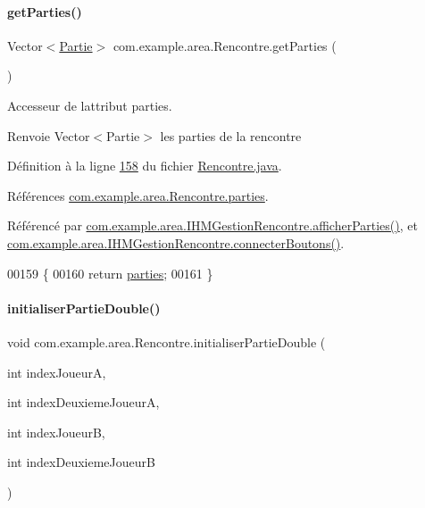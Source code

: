 \paragraph{\texorpdfstring{get\+Parties()}{getParties()}}
{\footnotesize\ttfamily Vector$<$\hyperlink{classcom_1_1example_1_1area_1_1_partie}{Partie}$>$ com.\+example.\+area.\+Rencontre.\+get\+Parties (\begin{DoxyParamCaption}{ }\end{DoxyParamCaption})}



Accesseur de l\textquotesingle{}attribut parties. 

\begin{DoxyReturn}{Renvoie}
Vector$<$\+Partie$>$ les parties de la rencontre 
\end{DoxyReturn}


Définition à la ligne \hyperlink{_rencontre_8java_source_l00158}{158} du fichier \hyperlink{_rencontre_8java_source}{Rencontre.\+java}.



Références \hyperlink{_rencontre_8java_source_l00023}{com.\+example.\+area.\+Rencontre.\+parties}.



Référencé par \hyperlink{_i_h_m_gestion_rencontre_8java_source_l00322}{com.\+example.\+area.\+I\+H\+M\+Gestion\+Rencontre.\+afficher\+Parties()}, et \hyperlink{_i_h_m_gestion_rencontre_8java_source_l00158}{com.\+example.\+area.\+I\+H\+M\+Gestion\+Rencontre.\+connecter\+Boutons()}.


\begin{DoxyCode}
00159     \{
00160         \textcolor{keywordflow}{return} \hyperlink{classcom_1_1example_1_1area_1_1_rencontre_a9bdc6df389184fc2ecb4d87a7879213a}{parties};
00161     \}
\end{DoxyCode}
\mbox{\label{classcom_1_1example_1_1area_1_1_rencontre_a5dd70b0d58f74626bdb4bd21a21d661c}} 
\paragraph{\texorpdfstring{initialiser\+Partie\+Double()}{initialiserPartieDouble()}}
{\footnotesize\ttfamily void com.\+example.\+area.\+Rencontre.\+initialiser\+Partie\+Double (\begin{DoxyParamCaption}\item[{int}]{index\+JoueurA,  }\item[{int}]{index\+Deuxieme\+JoueurA,  }\item[{int}]{index\+JoueurB,  }\item[{int}]{index\+Deuxieme\+JoueurB }\end{DoxyParamCaption})\hspace{0.3cm}{\ttfamily [private]}}



